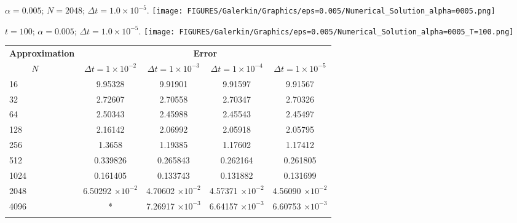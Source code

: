 \begin{frame}
	$\alpha = 0.005$; $N=2048$; $\Delta t = 1.0 \times 10^{-5}$.
	\centering
	\texttt{[image: FIGURES/Galerkin/Graphics/eps=0.005/Numerical\_Solution\_alpha=0005.png]}
\end{frame}
\begin{frame}
	$t = 100$; $\alpha = 0.005$; $\Delta t = 1.0 \times 10^{-5}$.
	\centering
	\texttt{[image: FIGURES/Galerkin/Graphics/eps=0.005/Numerical\_Solution\_alpha=0005\_T=100.png]}
\end{frame}

\begin{frame}
\begin{table}
	\begin{tabular}{lcccc}
		\toprule
		\multicolumn{1}{c}{\textbf{Approximation}} & \multicolumn{4}{c}{\textbf{Error}} \\
		$\hspace{9mm}N$ & $\Delta t=1\times 10^{-2}$ & $\Delta t=1\times 10^{-3}$ & $\Delta t=1\times 10^{-4}$ & $\Delta t=1\times 10^{-5}$ \\
		\midrule
		\hspace{7mm} 16 & 9.95328   & 9.91901    & 9.91597    & 9.91567    \\
		\midrule
		\hspace{7mm} 32 & 2.72607   & 2.70558    & 2.70347    & 2.70326    \\
		\midrule
		\hspace{7mm} 64 & 2.50343   & 2.45988    & 2.45543    & 2.45497    \\
		\midrule
		\hspace{7mm} 128 & 2.16142   & 2.06992    & 2.05918    & 2.05795    \\
		\midrule
		\hspace{7mm} 256 & 1.3658    & 1.19385    & 1.17602    & 1.17412    \\
		\midrule
		\hspace{7mm} 512 & 0.339826  & 0.265843   & 0.262164   & 0.261805   \\
		\midrule
		\hspace{7mm} 1024 & 0.161405  & 0.133743   & 0.131882   & 0.131699   \\
		\midrule
		\hspace{7mm} 2048 & 6.50292 $\times 10^{-2}$ & 4.70602 $\times 10^{-2}$ & 4.57371 $\times 10^{-2}$  & 4.56090 $\times 10^{-2}$  \\
		\midrule
		\hspace{7mm} 4096 & * & 7.26917 $\times 10^{-3}$ & 6.64157 $\times 10^{-3}$ & 6.60753 $\times 10^{-3}$ \\
		\\
		\bottomrule
	\end{tabular}
\end{table}
\end{frame}


